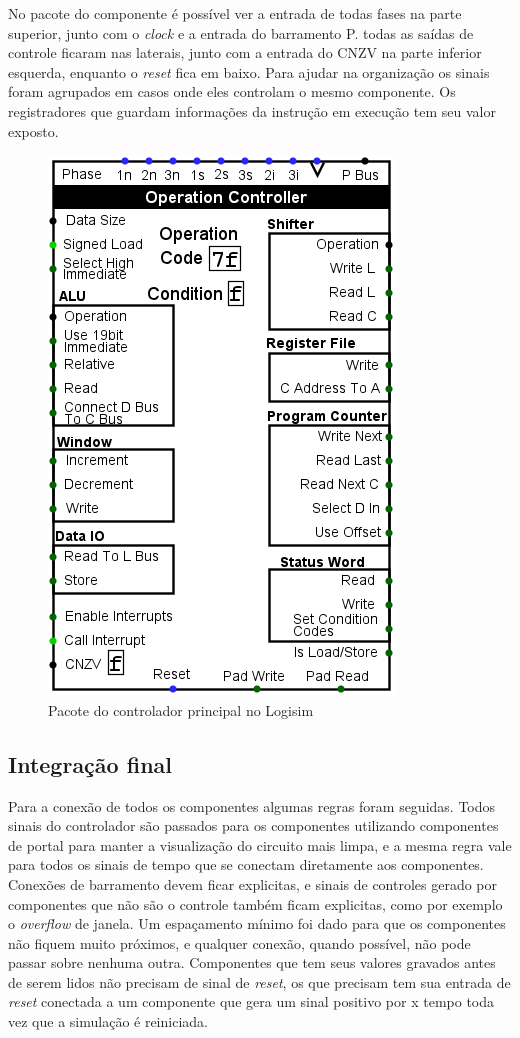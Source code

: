 \documentclass[
	article,			%
	11pt,				%
	oneside,			%
	a4paper,			%
	english,			%
	brazil,				%
	sumario=tradicional
	]{abntex2}
\begin{document}
No pacote do componente é possível ver a entrada de todas fases na parte superior, junto com o \textit{clock} e a entrada do barramento P. todas as saídas de controle ficaram nas laterais, junto com a entrada do CNZV na parte inferior esquerda, enquanto o \textit{reset} fica em baixo. Para ajudar na organização os sinais foram agrupados em casos onde eles controlam o mesmo componente. Os registradores que guardam informações da instrução em execução tem seu valor exposto.
\begin{figure}[H]
    \centering
    \includegraphics[width=0.25\linewidth]{Logisim/controllerPack.png}
    \caption{Pacote do controlador principal no Logisim}
    \label{fig:controllerPack}
\end{figure}

\subsection{Integração final}
Para a conexão de todos os componentes algumas regras foram seguidas. Todos sinais do controlador são passados para os componentes utilizando componentes de portal para manter a visualização do circuito mais limpa, e a mesma regra vale para todos os sinais de tempo que se conectam diretamente aos componentes. Conexões de barramento devem ficar explicitas, e sinais de controles gerado por componentes que não são o controle também ficam explicitas, como por exemplo o \textit{overflow} de janela. Um espaçamento mínimo foi dado para que os componentes não fiquem muito próximos, e qualquer conexão, quando possível, não pode passar sobre nenhuma outra. Componentes que tem seus valores gravados antes de serem lidos não precisam de sinal de \textit{reset}, os que precisam tem sua entrada de \textit{reset} conectada a um componente que gera um sinal positivo por x tempo toda vez que a simulação é reiniciada.
\end{document}

